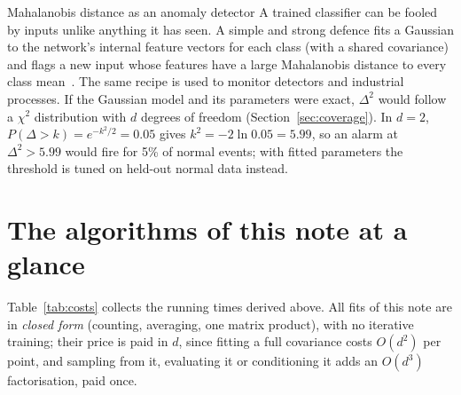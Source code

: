 \documentclass[11pt]{article}
\begin{document}
\begin{modern}{Mahalanobis distance as an anomaly detector}
A trained classifier can be fooled by inputs unlike anything it has seen. A simple and strong defence fits a
Gaussian to the network's internal feature vectors for each class (with a shared covariance) and flags a new input
whose features have a large Mahalanobis distance to every class mean~\cite{lee2018}. The same recipe is used to
monitor detectors and industrial processes. If the Gaussian model and its parameters were exact, $\Delta^2$ would
follow a $\chi^2$ distribution with $d$ degrees of freedom (Section~\ref{sec:coverage}). In $d = 2$,
$P(\Delta > k) = e^{-k^2/2} = 0.05$ gives $k^2 = -2\ln 0.05 = 5.99$, so an alarm at $\Delta^2 > 5.99$ would fire for
5\% of normal events; with fitted parameters the threshold is tuned on held-out
normal data instead.
\end{modern}

\section{The algorithms of this note at a glance}\label{sec:costs}

Table~\ref{tab:costs} collects the running times derived above. All fits of this note are in \emph{closed form}
(counting, averaging, one matrix product), with no iterative training; their price is paid in $d$, since fitting a
full covariance costs $O(d^2)$ per point, and sampling from it, evaluating it or conditioning it adds an $O(d^3)$
factorisation, paid once.
\end{document}
